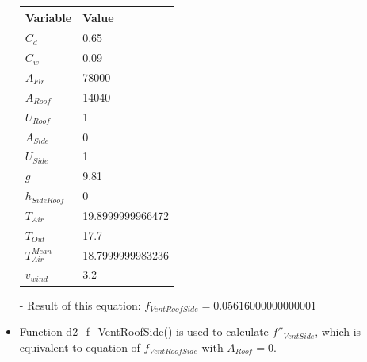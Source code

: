 \documentclass[a4paper]{article}
\begin{document}
\begin{itemize}
        \begin{table}[H]
          \centering
          \begin{tabular}{|l|l|}
            \hline
            \textbf{Variable}  & \textbf{Value}   \\ \hline
            \(C_d\)            & 0.65             \\ \hline
            \(C_w\)            & 0.09             \\ \hline
            \(A_{Flr}\)        & 78000            \\ \hline
            \(A_{Roof}\)       & 14040            \\ \hline
            \(U_{Roof}\)       & 1                \\ \hline
            \(A_{Side}\)       & 0                \\ \hline
            \(U_{Side}\)       & 1                \\ \hline
            \(g\)              & 9.81             \\ \hline
            \(h_{SideRoof}\)   & 0                \\ \hline
            \(T_{Air}\)        & 19.8999999966472 \\ \hline
            \(T_{Out}\)        & 17.7             \\ \hline
            \(T_{Air}^{Mean}\) & 18.7999999983236 \\ \hline
            \(v_{wind}\)       & 3.2              \\ \hline
          \end{tabular}
        \end{table}

  \item[-] Result of this equation: \(f_{VentRoofSide} = 0.05616000000000001\)

  \item Function d2\_f\_VentRoofSide() is used to calculate \(f''_{VentSide}\), which is equivalent to equation of \(f_{VentRoofSide}\) with \(A_{Roof} = 0\).


\end{itemize}
\end{document}
